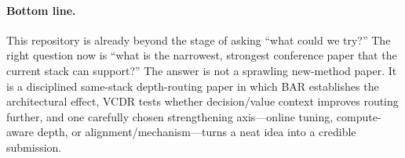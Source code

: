 \documentclass[11pt]{article}
\begin{document}
\paragraph{Bottom line.}
This repository is already beyond the stage of asking ``what could we try?'' The right question now is ``what is the narrowest, strongest conference paper that the current stack can support?'' The answer is not a sprawling new-method paper. It is a disciplined same-stack depth-routing paper in which BAR establishes the architectural effect, VCDR tests whether decision/value context improves routing further, and one carefully chosen strengthening axis---online tuning, compute-aware depth, or alignment/mechanism---turns a neat idea into a credible submission.
\end{document}
